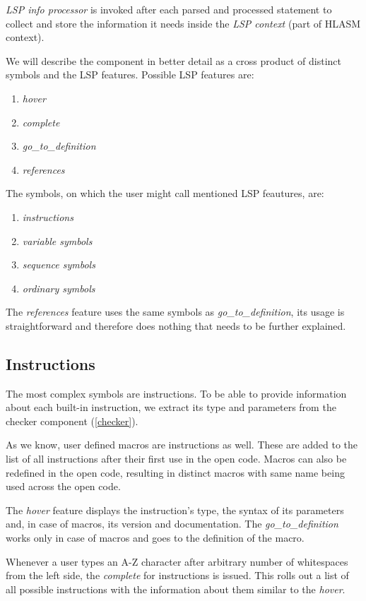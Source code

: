 \emph{LSP info processor} is invoked after each parsed and processed statement to collect and store the information it needs inside the \emph{LSP context} (part of HLASM context). 

We will describe the component in better detail as a cross product of distinct symbols and the LSP features. Possible LSP features are:
\begin{enumerate}
	\item \emph{hover}
	\item \emph{complete}
	\item \emph{go\_to\_definition}
	\item \emph{references}
\end{enumerate}
The symbols, on which the user might call mentioned LSP feautures, are:
\begin{enumerate}
	\item \emph{instructions}
	\item \emph{variable symbols}
	\item \emph{sequence symbols}
	\item \emph{ordinary symbols}
\end{enumerate}

The \emph{references} feature uses the same symbols as \emph{go\_to\_definition}, its usage is straightforward and therefore does nothing that needs to be further explained.

\subsection{Instructions}

The most complex symbols are instructions. To be able to provide information about each built-in instruction, we extract its type and parameters from the checker component (\cref{checker}).

As we know, user defined macros are instructions as well. These are added to the list of all instructions after their first use in the open code. Macros can also be redefined in the open code, resulting in distinct macros with same name being used across the open code.

The \emph{hover} feature displays the instruction's type, the syntax of its parameters and, in case of macros, its version and documentation. The \emph{go\_to\_definition} works only in case of macros and goes to the definition of the macro.

Whenever a user types an A-Z character after arbitrary number of whitespaces from the left side, the \emph{complete} for instructions is issued. This rolls out a list of all possible instructions with the information about them similar to the \emph{hover}.

